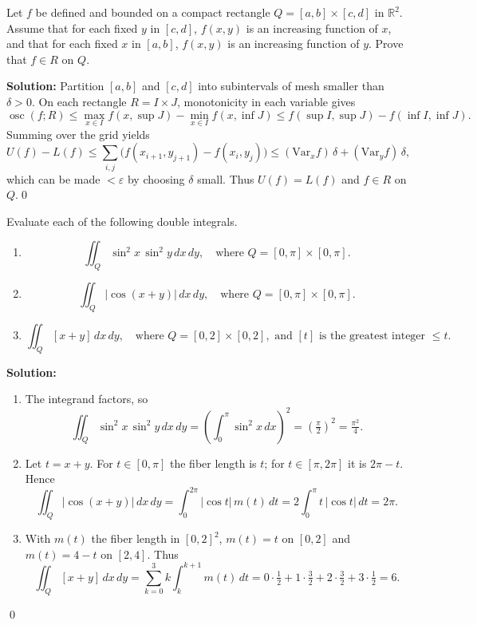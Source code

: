 \begin{problembox}
Let \( f \) be defined and bounded on a compact rectangle \( Q = [a, b] \times [c, d] \) in \( \mathbb{R}^2 \). Assume that for each fixed \( y \) in \([c, d]\), \( f(x, y) \) is an increasing function of \( x \), and that for each fixed \( x \) in \([a, b]\), \( f(x, y) \) is an increasing function of \( y \). Prove that \( f \in R \) on \( Q \).
\end{problembox}

\bigskip\noindent\textbf{Solution:}
Partition $[a,b]$ and $[c,d]$ into subintervals of mesh smaller than $\delta>0$. On each rectangle $R=I\times J$, monotonicity in each variable gives
\[ \operatorname{osc}(f;R) \le \max_{x\in I}\!f(x,\sup J)-\min_{x\in I}\!f(x,\inf J) \le f(\sup I,\sup J)-f(\inf I,\inf J). \]
Summing over the grid yields
\[ U(f)-L(f) \le \sum_{i,j} \big(f(x_{i+1},y_{j+1})-f(x_i,y_j)\big) \le (\text{Var}_x f)\,\delta + (\text{Var}_y f)\,\delta, \]
which can be made $<\varepsilon$ by choosing $\delta$ small. Thus $U(f)=L(f)$ and $f\in R$ on $Q$.\qed


\begin{problembox}
Evaluate each of the following double integrals.
\begin{enumerate}[label=(\alph*)]
    \item \[ \iint_{Q} \sin^2 x \, \sin^2 y \, dx \, dy, \quad \text{where } Q = [0, \pi] \times [0, \pi]. \]
    \item \[ \iint_{Q} |\cos (x + y)| \, dx \, dy, \quad \text{where } Q = [0, \pi] \times [0, \pi]. \]
    \item \[ \iint_{Q} [x + y] \, dx \, dy, \quad \text{where } Q = [0, 2] \times [0, 2], \text{ and } [t] \text{ is the greatest integer } \leq t. \]
\end{enumerate}
\end{problembox}

\bigskip\noindent\textbf{Solution:}
\begin{enumerate}[label=(\alph*)]
    \item The integrand factors, so
    \[ \iint_Q \sin^2 x\,\sin^2 y\,dx\,dy = \left(\int_0^{\pi} \sin^2 x\,dx\right)^2 = \left(\tfrac{\pi}{2}\right)^2 = \tfrac{\pi^2}{4}. \]
    \item Let $t=x+y$. For $t\in[0,\pi]$ the fiber length is $t$; for $t\in[\pi,2\pi]$ it is $2\pi-t$. Hence
    \[ \iint_Q |\cos(x+y)|\,dx\,dy = \int_0^{2\pi} |\cos t|\,m(t)\,dt = 2\int_0^{\pi} t\,|\cos t|\,dt = 2\pi. \]
    \item With $m(t)$ the fiber length in $[0,2]^2$, $m(t)=t$ on $[0,2]$ and $m(t)=4-t$ on $[2,4]$. Thus
    \[ \iint_Q [x+y]\,dx\,dy = \sum_{k=0}^3 k\int_k^{k+1} m(t)\,dt = 0\cdot\tfrac{1}{2} + 1\cdot\tfrac{3}{2} + 2\cdot\tfrac{3}{2} + 3\cdot\tfrac{1}{2} = 6. \]
\end{enumerate}\qed


